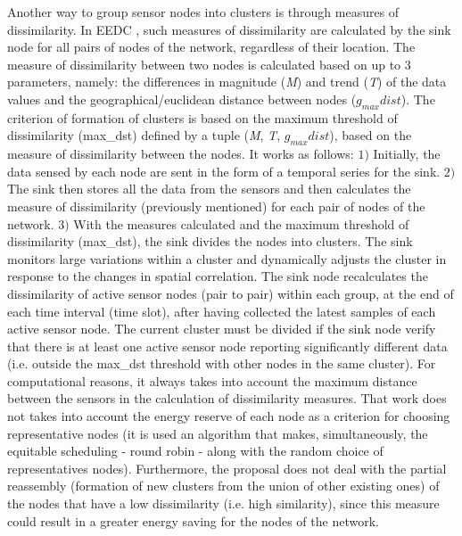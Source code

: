 \documentclass[conference]{IEEEtran}
\begin{document}
Another way to group sensor nodes into clusters is through measures of
dissimilarity.
In EEDC \cite{Liu2007}, such measures of dissimilarity are calculated by the
sink node for all pairs of nodes of the network, regardless of their location.
The measure of dissimilarity between two nodes is calculated based on up to $3$
parameters, namely:
the differences in magnitude (\textit{M}) and trend (\textit{T}) of the data
values and the geographical/euclidean distance between nodes ($g_{max}dist$).
The criterion of formation of clusters is based on the maximum threshold of
dissimilarity (max\_dst) defined by a tuple (\textit{M}, \textit{T},
$g_{max}dist$), based on the measure of dissimilarity between the nodes. It
works as follows: $1)$ Initially, the data sensed by each node are sent in the
form of a temporal series for the sink. $2)$ The sink then stores all the data
from the sensors and then calculates the measure of dissimilarity (previously
mentioned) for each pair of nodes of the network. $3)$ With the measures
calculated and the maximum threshold of dissimilarity (max\_dst), the sink
divides the nodes into clusters. The sink monitors large variations within a
cluster and dynamically adjusts the cluster in response to the changes in
spatial correlation.
The sink node recalculates the dissimilarity of active sensor nodes (pair to
pair) within each group, at the end of each time interval (time slot), after
having collected the latest samples of each active sensor node. The current
cluster must be divided if the sink node verify that there is at least one
active sensor node reporting significantly different data (i.e. outside the
max\_dst threshold with other nodes in the same cluster).
For computational reasons, it always takes into account the maximum distance
between the sensors in the calculation of dissimilarity measures.
That work does not takes into account the energy reserve of each node as a
criterion for choosing representative nodes (it is used an algorithm that makes,
simultaneously, the equitable scheduling - round robin - along with the random
choice of representatives nodes).
Furthermore, the proposal does not deal with the partial reassembly (formation
of new clusters from the union of other existing ones) of the nodes that have a
low dissimilarity (i.e. high similarity), since this measure could result in a
greater energy saving for the nodes of the network.
\end{document}
